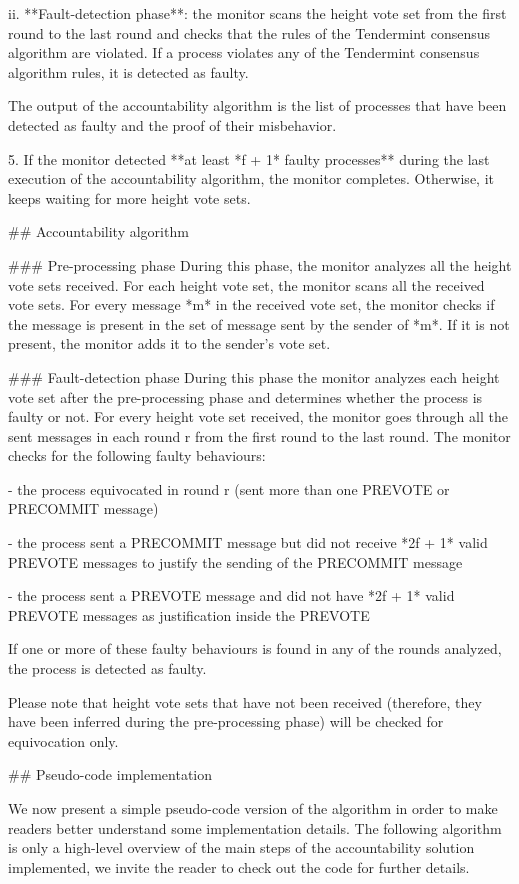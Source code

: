 \documentclass[a4paper,11pt,oneside]{report}
\begin{document}
\begin{markdown}
    ii. **Fault-detection phase**: the monitor scans the height vote set from the first round to the last round and checks that the rules of the Tendermint consensus algorithm are violated. If a process violates any of the Tendermint consensus algorithm rules, it is detected as faulty. 

    The output of the accountability algorithm is the list of processes that have been detected as faulty and the proof of their misbehavior.
  
5. If the monitor detected **at least *f + 1* faulty processes** during the last execution of the accountability algorithm, the monitor completes. Otherwise, it keeps waiting for more height vote sets.

## Accountability algorithm

### Pre-processing phase
During this phase, the monitor analyzes all the height vote sets received. 
For each height vote set, the monitor scans all the received vote sets. 
For every message *m* in the received vote set, the monitor checks if the message is present in the set of message sent by the sender of *m*. If it is not present, the monitor adds it to the sender's vote set.   

### Fault-detection phase
During this phase the monitor analyzes each height vote set after the pre-processing phase and determines whether the process is faulty or not.
For every height vote set received, the monitor goes through all the sent messages in each round r from the first round to the last round. The monitor checks for the following faulty behaviours:

- the process equivocated in round r (sent more than one PREVOTE or PRECOMMIT message)

- the process sent a PRECOMMIT message but did not receive *2f + 1* valid PREVOTE messages to justify the sending of the PRECOMMIT message

- the process sent a PREVOTE message and did not have *2f + 1* valid PREVOTE messages as justification inside the PREVOTE

If one or more of these faulty behaviours is found in any of the rounds analyzed, the process is detected as faulty.

Please note that height vote sets that have not been received (therefore, they have been inferred during the pre-processing phase) will be checked for equivocation only.

## Pseudo-code implementation

We now present a simple pseudo-code version of the algorithm in order to make readers better understand some implementation details.
The following algorithm is only a high-level overview of the main steps of the accountability solution implemented, we invite the reader to check out the code for further details.  


\end{markdown}
\end{document}
